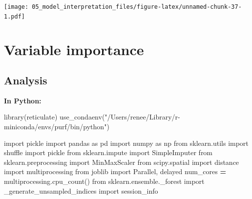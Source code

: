 \documentclass[
  11pt,
  oneside]{book}
\newenvironment{Shaded}{\begin{snugshade}}{\end{snugshade}}
\newcommand{\FunctionTok}[1]{\textcolor[rgb]{0.00,0.00,0.00}{#1}}
\newcommand{\ImportTok}[1]{#1}
\newcommand{\NormalTok}[1]{#1}
\newcommand{\OperatorTok}[1]{\textcolor[rgb]{0.81,0.36,0.00}{\textbf{#1}}}
\newcommand{\StringTok}[1]{\textcolor[rgb]{0.31,0.60,0.02}{#1}}
\begin{document}
\texttt{[image: 05\_model\_interpretation\_files/figure-latex/unnamed-chunk-37-1.pdf]}

\hypertarget{variable-importance}{%
\section{Variable importance}\label{variable-importance}}

\hypertarget{analysis-7}{%
\subsection{Analysis}\label{analysis-7}}

\textbf{In Python: }

\begin{Shaded}
\begin{Highlighting}[]
\FunctionTok{library}\NormalTok{(reticulate)}
\FunctionTok{use\_condaenv}\NormalTok{(}\StringTok{"/Users/renee/Library/r{-}miniconda/envs/purf/bin/python"}\NormalTok{)}
\end{Highlighting}
\end{Shaded}

\begin{Shaded}
\begin{Highlighting}[]
\ImportTok{import}\NormalTok{ pickle}
\ImportTok{import}\NormalTok{ pandas }\ImportTok{as}\NormalTok{ pd}
\ImportTok{import}\NormalTok{ numpy }\ImportTok{as}\NormalTok{ np}
\ImportTok{from}\NormalTok{ sklearn.utils }\ImportTok{import}\NormalTok{ shuffle}
\ImportTok{import}\NormalTok{ pickle}
\ImportTok{from}\NormalTok{ sklearn.impute }\ImportTok{import}\NormalTok{ SimpleImputer}
\ImportTok{from}\NormalTok{ sklearn.preprocessing }\ImportTok{import}\NormalTok{ MinMaxScaler}
\ImportTok{from}\NormalTok{ scipy.spatial }\ImportTok{import}\NormalTok{ distance}
\ImportTok{import}\NormalTok{ multiprocessing}
\ImportTok{from}\NormalTok{ joblib }\ImportTok{import}\NormalTok{ Parallel, delayed}
\NormalTok{num\_cores }\OperatorTok{=}\NormalTok{ multiprocessing.cpu\_count()}
\ImportTok{from}\NormalTok{ sklearn.ensemble.\_forest }\ImportTok{import}\NormalTok{ \_generate\_unsampled\_indices}
\ImportTok{import}\NormalTok{ session\_info}
\end{Highlighting}
\end{Shaded}
\end{document}
